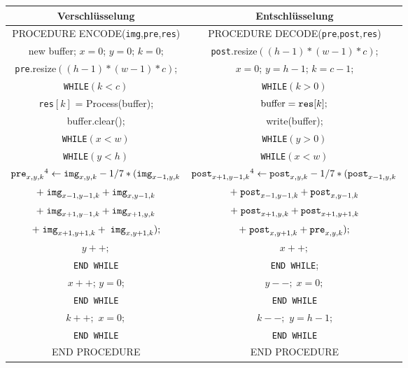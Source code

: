\documentclass[a4paper,12pt]{article}
\begin{document}
\begin{tabular}{c|c}
Verschlüsselung & Entschlüsselung
\\
\hline
PROCEDURE ENCODE({\tt{img}},{\tt{pre}},{\tt{res}}) & PROCEDURE DECODE({\tt{pre}},{\tt{post}},{\tt{res}})
\\
new buffer; $x=0$; $y=0$; $k=0$; & {\tt{post}}.resize$((h-1)*(w-1)*c)$;
\\
{\tt{pre}}.resize$((h-1)*(w-1)*c)$; & $x=0$; $y=h-1$; $k=c-1$;
\\
{\tt{WHILE}}$(k < c)$ &                  {\tt{WHILE}}$(k > 0)$
\\
{\tt{res}}$[k]$ = Process(buffer);  &  $\text{buffer} = \text{{\tt{res}}}[k];$
\\
buffer.clear(); & write(buffer);
\\
{\tt{WHILE}}$(x < w)$ &   {\tt{WHILE}}$(y > 0)$          
\\
{\tt{WHILE}}$(y < h)$ &   {\tt{WHILE}}$(x<w)$     
\\
$\text{{\tt{pre}}}_{x,y,k}\footnotemark[4]\leftarrow \text{{\tt{img}}}_{x,y,k} - 1/7 *(\text{{\tt{img}}}_{x-1,y,k}$ &  $\text{{\tt{post}}}_{x+1,y-1,k}\footnotemark[4]\leftarrow \text{{\tt{post}}}_{x,y,k} - 1/7 *(\text{{\tt{post}}}_{x-1,y,k} $ 
\\
$+\;\text{{\tt{img}}}_{x-1,y-1,k} + \text{{\tt{img}}}_{x,y-1,k}$ & $+\;\text{{\tt{post}}}_{x-1,y-1,k} + \text{{\tt{post}}}_{x,y-1,k}$  
\\
$+\;\text{{\tt{img}}}_{x+1,y-1,k} + \text{{\tt{img}}}_{x+1,y,k}$ & $+\;\text{{\tt{post}}}_{x+1,y,k} + \text{{\tt{post}}}_{x+1,y+1,k}  $
\\
 $+\;\text{{\tt{img}}}_{x+1,y+1,k} +\;\text{{\tt{img}}}_{x,y+1,k});$    &   $+\;\text{{\tt{post}}}_{x,y+1,k} + \text{{\tt{pre}}}_{x,y,k});$
\\
 $y++;$  & $x++;$
\\
{\tt{END {\tt{WHILE}}}}   & {\tt{END {\tt{WHILE}}}};
\\
$x++$; $y=0$;    & $y--;\;x=0;$  
\\
{\tt{END {\tt{WHILE}}}}   & {\tt{END {\tt{WHILE}}}} 
\\
$k++;$ $x=0;$  &  $k--;$ $y=h-1$;
\\
{\tt{END {\tt{WHILE}}}}    &   {\tt{END {\tt{WHILE}}}} 
\\
END PROCEDURE & END PROCEDURE
\end{tabular}
\end{document}
